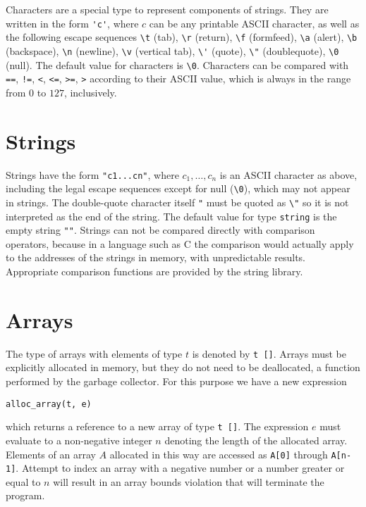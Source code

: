 \documentclass[11pt]{article}
\begin{document}
Characters are a special type to represent components of strings.
They are written in the form \lstinline!'c'!, where $c$ can be any
printable ASCII character, as well as the following escape sequences
\lstinline'\t' (tab), \lstinline'\r' (return), \lstinline'\f'
(formfeed), \lstinline'\a' (alert), \lstinline'\b' (backspace),
\lstinline'\n' (newline), \lstinline'\v' (vertical tab),
\lstinline!\'! (quote), \lstinline'\"' (doublequote), \lstinline'\0'
(null).  The default value for characters is \lstinline'\0'.
Characters can be compared with \lstinline'==', \lstinline'!=',
\lstinline'<', \lstinline'<=', \lstinline'>=', \lstinline'>' according
to their ASCII value, which is always in the range from $0$ to $127$,
inclusively.

\section{Strings}

Strings have the form \lstinline'"c1...cn"', where $c_1, \ldots, c_n$ is an
ASCII character as above, including the legal escape sequences except
for null (\lstinline'\0'), which may not appear in strings.  The
double-quote character itself \lstinline'"' must be quoted as \lstinline'\"' so
it is not interpreted as the end of the string.  The default value for
type \lstinline'string' is the empty string \lstinline'""'.  Strings can not be
compared directly with comparison operators, because in a language
such as C the comparison would actually apply to the addresses of the
strings in memory, with unpredictable results.  Appropriate comparison
functions are provided by the string library.

\section{Arrays}

The type of arrays with elements of type $t$ is denoted
by \lstinline't []'.  Arrays must be explicitly allocated in memory,
but they do not need to be deallocated, a function performed by
the garbage collector.  For this purpose we have a new expression
\begin{lstlisting}
alloc_array(t, e)
\end{lstlisting}
which returns a reference to a new array of type \lstinline't []'.  The
expression $e$ must evaluate to a non-negative integer $n$
denoting the length of the allocated array.  Elements
of an array $A$ allocated in this way are accessed as
\lstinline'A[0]' through \lstinline'A[n-1]'.  Attempt to index an array
with a negative number or a number greater or equal to $n$ will
result in an array bounds violation that will terminate the
program.
\end{document}
